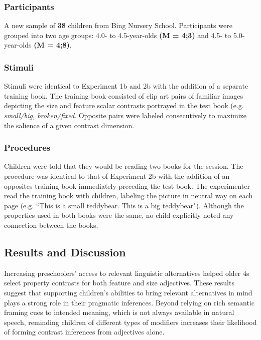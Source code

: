 \documentclass[10pt,letterpaper]{article}
\begin{document}
\subsubsection{Participants}

A new sample of \textbf{38} children from Bing Nursery School. Participants were grouped into two age groups: 4.0- to 4.5-year-olds \textbf{(M = 4;3)} and 4.5- to 5.0-year-olds \textbf{(M = 4;8)}.

\subsubsection{Stimuli}

Stimuli were identical to Experiment 1b and 2b with the addition of a separate training book.  The training book consisted of clip art pairs of familiar images depicting the size and feature scalar contrasts portrayed in the test book (e.g. \emph{small/big, broken/fixed}.  Opposite pairs were labeled consecutively to maximize the salience of a given contrast dimension. 

\subsubsection{Procedures}

Children were told that they would be reading two books for the session.  The procedure was identical to that of Experiment 2b with the addition of an opposites training book immediately preceding the test book. The experimenter read the training book with children, labeling the picture in neutral way on each page (e.g. ``This is a small teddybear. This is a big teddybear").  Although the properties used in both books were the same, no child explicitly noted any connection between the books. 

\subsection{Results and Discussion}

Increasing preschoolers' access to relevant linguistic alternatives helped older 4s select property contrasts for both feature and size adjectives.  These results suggest that supporting children's abilities to bring relevant alternatives in mind plays a strong role in their pragmatic inferences. Beyond relying on rich semantic framing cues to intended meaning, which is not always available in natural speech, reminding children of different types of modifiers increases their likelihood of forming contrast inferences from adjectives alone. 
\end{document}
